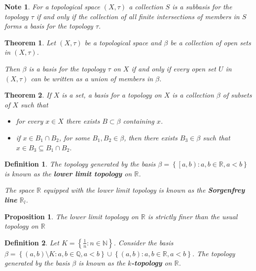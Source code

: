 \documentclass[14pt,twoside]{extreport}
\theoremstyle{dotless}
\newtheorem*{defn}{Definition}
\newtheorem*{thm}{Theorem} %
\newtheorem*{note}{Note} %
\newtheorem*{prop}{Proposition} %
\begin{document}
\begin{note}
    For a topological space $\left (X, \tau\right )$ a collection $S$ is a subbasis for the topology $\tau$ if and only if the collection of all finite intersections of members in $S$ forms a basis for the topology $\tau$.
\end{note}

\begin{thm}
    Let $\left (X, \tau\right )$ be a topological space and $\beta$ be a collection of open sets in $\left (X, \tau\right )$.

    Then $\beta$ is a basis for the topology $\tau$ on $X$ if and only if every open set $U$ in $\left (X, \tau\right )$ can be written as a union of members in $\beta$.
\end{thm}

\begin{thm}
    If $X$ is a set, a basis for a topology on $X$ is a collection $\beta$ of subsets of $X$ such that 
    \begin{itemize}
        \item for every $x \in X$ there exists $B \subset \beta$ containing $x$.
        \item if $x \in B_1 \cap B_2$, for some $B_1, B_2 \in \beta$, then there exists $B_3 \in \beta$ such that $x \in B_3 \subseteq B_1 \cap B_2$.
    \end{itemize}
\end{thm}

\begin{defn}
    The topology generated by the basis $\beta = \left\{ \left [a, b\right )  :  a, b \in \mathbb{R}, a < b \right\}$ is known as the \textbf{lower limit topology} on $\mathbb{R}$. 

    The space $\mathbb{R}$ equipped with the lower limit topology is known as the \textbf{Sorgenfrey line} $\mathbb{R}_l$.
\end{defn}

\begin{prop}
    The lower limit topology on $\mathbb{R}$ is strictly finer than the usual topology on $\mathbb{R}$
\end{prop}

\begin{defn}
    Let $K = \left\{ \frac{1}{n}  :  n \in \mathbb{N} \right\}$. Consider the basis \\ $\beta = \left\{ \left (a, b\right ) \setminus K  :  a,b \in \mathbb{Q}, a < b \right\} \cup \left\{ \left (a,b\right )  :  a,b \in \mathbb{R}, a < b \right\}$.  The topology generated by the basis $\beta$ is known as the \textbf{$k$-topology} on $\mathbb{R}$.
\end{defn}
\end{document}
